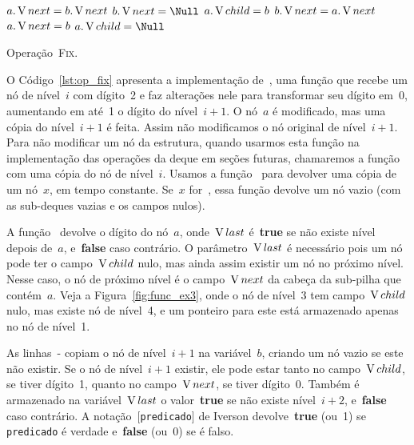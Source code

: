 \documentclass[main.tex]{subfiles}
\begin{document}
\begin{algorithm}
\begin{algorithmic}[1]
          \label{line:fix:next_a_bb}
            \State $a.\operatorname{V}{next} = b.\operatorname{V}{next}$
            \State $b.\V{next} = \Null$ \label{line:fix:next_a_be}
        \EndIf
        \State $a.\operatorname{V}{child} = b$ \label{line:fix:child_a_b}
    \Else
         \label{line:fix:next_b_ab}
            \State $b.\operatorname{V}{next} = a.\operatorname{V}{next}$  \label{line:fix:next_b_ae}
        \EndIf
        \State $a.\operatorname{V}{next} = b$ \label{line:fix:child_b_ab}
        \State $a.\V{child} = \Null$  \label{line:fix:child_b_ae}
    \EndIf
\EndFunction

\end{algorithmic}
\caption{Operação~\textsc{Fix}.} \label{lst:op_fix}
\end{algorithm}

O Código~\ref{lst:op_fix} apresenta a implementação de~, uma função que recebe um nó de nível~$i$ com dígito~2 e faz alterações nele para transformar seu dígito em~0, aumentando em até~1 o dígito do nível~$i+1$. O nó~$a$ é modificado, mas uma cópia do nível~$i+1$ é feita. Assim não modificamos o nó original de nível~$i+1$. Para não modificar um nó da estrutura, quando usarmos esta função na implementação das operações da deque em seções futuras, chamaremos a função com uma cópia do nó de nível~$i$. Usamos a função~ para devolver uma cópia de um nó~$x$, em tempo constante. Se~$x$ for~, essa função devolve um nó vazio (com as sub-deques vazias e os campos nulos).

A função~ devolve o dígito do nó~$a$, onde~$\operatorname{V}{last}$ é~\textbf{true} se não existe nível depois de~$a$, e~\textbf{false} caso contrário. O parâmetro~$\operatorname{V}{last}$ é necessário pois um nó pode ter o campo~$\operatorname{V}{child}$ nulo, mas ainda assim existir um nó no próximo nível. Nesse caso, o nó de próximo nível é o campo~$\operatorname{V}{next}$ da cabeça da sub-pilha que contém~$a$. Veja a Figura~\ref{fig:func_ex3}, onde o nó de nível~3 tem campo~$\operatorname{V}{child}$ nulo, mas existe nó de nível~4, e um ponteiro para este está armazenado apenas no nó de nível~1.

As linhas~{-} copiam o nó de nível~$i+1$ na variável~$b$, criando um nó vazio se este não existir. Se o nó de nível~${i+1}$ existir, ele pode estar tanto no campo~$\operatorname{V}{child}$, se tiver dígito~1, quanto no campo~$\operatorname{V}{next}$, se tiver dígito~0.
Também é armazenado na variável~$\operatorname{V}{last}$ o valor~\textbf{true} se não existe nível~$i+2$, e~\textbf{false} caso contrário. A notação~$[$\texttt{predicado}$]$ de Iverson devolve~\textbf{true} (ou~1) se \texttt{predicado} é verdade e~\textbf{false} (ou~0) se é falso.
\end{document}
